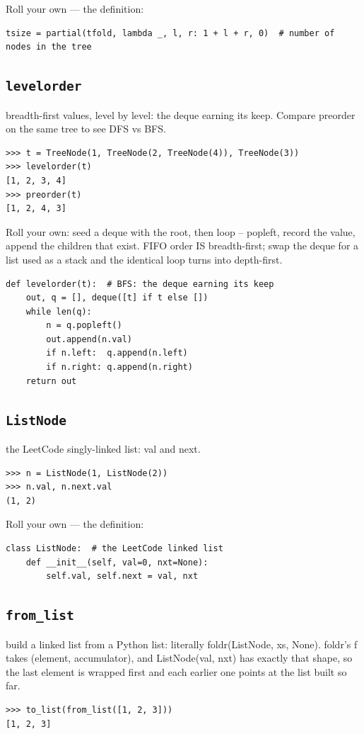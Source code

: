 \documentclass[10pt,letterpaper]{book}
\begin{document}
Roll your own --- the definition:

\begin{lstlisting}[style=ex]
tsize = partial(tfold, lambda _, l, r: 1 + l + r, 0)  # number of nodes in the tree
\end{lstlisting}

\subsection{\texttt{levelorder}}\label{def:levelorder}
breadth-first values, level by level: the deque earning its keep. Compare preorder on the same tree to see DFS vs BFS.
\begin{lstlisting}[style=ex]
>>> t = TreeNode(1, TreeNode(2, TreeNode(4)), TreeNode(3))
>>> levelorder(t)
[1, 2, 3, 4]
>>> preorder(t)
[1, 2, 4, 3]
\end{lstlisting}

Roll your own: seed a deque with the root, then loop -- popleft, record the value, append the children that exist. FIFO order IS breadth-first; swap the deque for a list used as a stack and the identical loop turns into depth-first.

\begin{lstlisting}[style=ex]
def levelorder(t):  # BFS: the deque earning its keep
    out, q = [], deque([t] if t else [])
    while len(q):
        n = q.popleft()
        out.append(n.val)
        if n.left:  q.append(n.left)
        if n.right: q.append(n.right)
    return out
\end{lstlisting}
\subsection{\texttt{ListNode}}\label{def:ListNode}
the LeetCode singly-linked list: val and next.
\begin{lstlisting}[style=ex]
>>> n = ListNode(1, ListNode(2))
>>> n.val, n.next.val
(1, 2)
\end{lstlisting}

Roll your own --- the definition:

\begin{lstlisting}[style=ex]
class ListNode:  # the LeetCode linked list
    def __init__(self, val=0, nxt=None):
        self.val, self.next = val, nxt
\end{lstlisting}
\subsection{\texttt{from\_list}}\label{def:from-list}
build a linked list from a Python list: literally foldr(ListNode, xs, None). foldr's f takes (element, accumulator), and ListNode(val, nxt) has exactly that shape, so the last element is wrapped first and each earlier one points at the list built so far.
\begin{lstlisting}[style=ex]
>>> to_list(from_list([1, 2, 3]))
[1, 2, 3]
\end{lstlisting}
\end{document}
